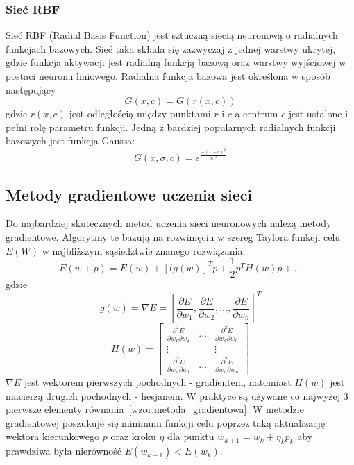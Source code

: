 \pagebreak
\subsubsection*{Sieć RBF}
Sieć RBF (Radial Basis Function) jest sztuczną siecią neuronową o radialnych funkcjach bazowych. Sieć taka składa się zazwyczaj z jednej warstwy ukrytej, gdzie funkcja aktywacji jest radialną funkcją bazową oraz 
warstwy wyjściowej w postaci neuronu liniowego. Radialna funkcja bazowa jest określona w sposób następujący\cite[str. 1]{Bartkowiak}
\begin{equation}
	G(x,c) = G(r(x,c))
\end{equation}
gdzie $r(x,c)$ jest odległością między punktami $r$ i $c$ a centrum $c$ jest ustalone i pełni rolę parametru funkcji. Jedną z bardziej popularnych radialnych funkcji bazowych jest funkcja Gaussa:
\begin{equation}
	G(x,\sigma,c) = e^{\frac{-(x-c)^2}{2\sigma^2}}
\end{equation}

\newpage
\subsection{Metody gradientowe uczenia sieci}
Do najbardziej skutecznych metod uczenia sieci neuronowych należą metody gradientowe. Algorytmy te bazują na rozwinięciu w szereg Taylora funkcji celu $E(W)$ w najbliższym sąsiedztwie znanego rozwiązania\cite[str. 54]{Osowski}.
\begin{equation}
	\label{wzor:metoda_gradientowa}
	E(w + p) = E(w) + [(g(w)]^Tp + \frac{1}{2}p^TH(w)p + \hdots
\end{equation}
gdzie
$$g(w) = \nabla E = [\frac{\partial E}{\partial w_1}, \frac{\partial E}{\partial w_2}, \hdots, \frac{\partial E}{\partial w_n}]^T$$
$$H(w) = \begin{bmatrix}
\frac{\partial^2 E}{\partial w_1 \partial w_2} & \hdots & \frac{\partial^2 E}{\partial w_1 \partial w_n}\\
\vdots & & \vdots \\
\frac{\partial^2 E}{\partial w_n \partial w_1} & \hdots & \frac{\partial^2 E}{\partial w_n \partial w_n}
\end{bmatrix}$$
$\nabla E$ jest wektorem pierwszych pochodnych - gradientem, natomiast $H(w)$ jest macierzą drugich pochodnych - hesjanem. W praktyce są używane co najwyżej 3 pierwsze elementy równania~\ref{wzor:metoda_gradientowa}. W metodzie gradientowej poszukuje się minimum funkcji celu poprzez taką aktualizację wektora kierunkowego $p$ oraz kroku $\eta$ dla punktu $w_{k+1} = w_k + \eta_k p_k$ aby prawdziwa była nierówność $E(w_{k+1}) < E(w_k)$.

